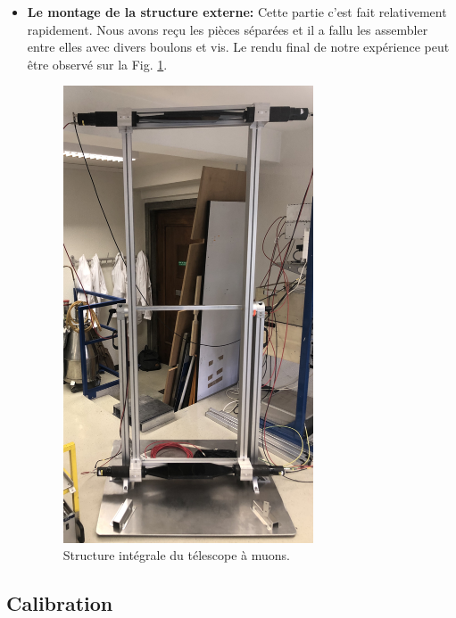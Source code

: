 \documentclass[12pt]{article}
\begin{document}
\begin{itemize}
    \item \textbf{Le montage de la structure externe: } Cette partie c'est fait relativement rapidement. Nous avons reçu les pièces séparées et il a fallu les assembler entre elles avec divers boulons et vis. Le rendu final de notre expérience peut être observé sur la Fig. \ref{fig:Structure_integrale}.
    \begin{figure}[htpb!]
        \centering
        \includegraphics[width=0.7\textwidth]{Images/Photos/Structure_integrale_exp.jpg}
        \caption{Structure intégrale du télescope à muons.}
        \label{fig:Structure_integrale}
    \end{figure}
    
    \end{itemize}



\subsection{Calibration}
\end{document}
